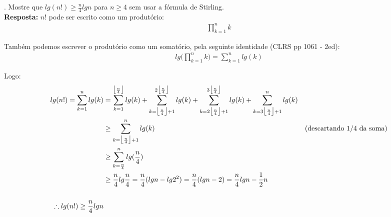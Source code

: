 
. Mostre que $lg(n!) \geq \frac{n}{4} lg n$ para $n \geq 4$ sem usar a fórmula de Stirling.\\[6pt]
\textbf{Resposta:} $n!$ pode ser escrito como um produtório:
\begin{align*}
\prod_{k=1}^n k
\end{align*}

Também podemos escrever o produtório como um somatório, pela seguinte identidade (CLRS pp 1061 - 2ed):
\begin{align*}
lg\big(\prod_{k=1}^n k\big) = \sum_{k=1}^n lg(k)
\end{align*}

Logo:
\begin{align*}
lg(n!) = \sum_{k=1}^n lg(k) &= \sum_{k=1}^{\big\lfloor\frac{n}{4}\big\rfloor} lg(k) + \sum_{k=\big\lfloor\frac{n}{4}\big\rfloor + 1}^{2\big\lfloor\frac{n}{4}\big\rfloor} lg(k) + \sum_{k=2\big\lfloor\frac{n}{4}\big\rfloor + 1}^{3\big\lfloor\frac{n}{4}\big\rfloor} lg(k) + \sum_{k=3\big\lfloor\frac{n}{4}\big\rfloor + 1}^{n} lg(k) \\
&\geq \sum_{k=\big\lfloor\frac{n}{4}\big\rfloor + 1}^{n} lg(k) & \text{(descartando 1/4 da soma)} \\
&\geq \sum_{k=\frac{n}{4}}^n lg(\frac{n}{4}) \\
&\geq \frac{n}{4}lg\frac{n}{4} = \frac{n}{4}(lg n - lg 2^2) = \frac{n}{4}(lg n - 2) = \frac{n}{4}lg n - \frac{1}{2}n\\\\
\therefore lg(n!) \geq \frac{n}{4}lg n
\end{align*}


